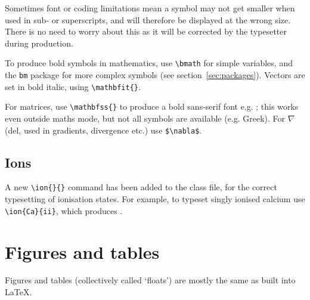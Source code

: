 \documentclass[a4paper,fleqn,usenatbib,useAMS]{mnras}
\begin{document}
Sometimes font or coding limitations mean a symbol may not get smaller when used in sub- or superscripts, and will therefore be displayed at the wrong size. There is no need to worry about this as it will be corrected by the typesetter during production.

To produce bold symbols in mathematics, use \verb'\bmath' for simple variables, and the \verb'bm' package for more complex symbols (see section~\ref{sec:packages}). Vectors are set in bold italic, using \verb'\mathbfit{}'.

For matrices, use \verb'\mathbfss{}' to produce a bold sans-serif font e.g. ; this works even outside maths mode, but not all symbols are available (e.g. Greek). For $\nabla$ (del, used in gradients, divergence etc.) use \verb'$\nabla$'.

\subsection{Ions}

A new \verb'\ion{}{}' command has been added to the class file, for the correct typesetting of ionisation states.
For example, to typeset singly ionised calcium use \verb'\ion{Ca}{ii}', which produces .

\section{Figures and tables}
\label{sec:fig_table}
Figures and tables (collectively called `floats') are mostly the same as built into \LaTeX.
\end{document}
